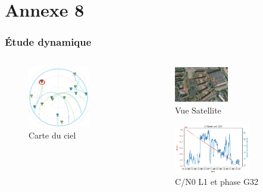\documentclass[xcolor=dvipsnames,envcountsect]{beamer}
\begin{document}
\section{Annexe 8}
\begin{frame}
	\frametitle{Étude dynamique}
	\begin{columns}
		\begin{column}{0.5\textwidth}
			\begin{figure}
				\centering
				\includegraphics[width=0.7\textwidth]{./Figures/skyplot_dyn.png}
				\caption {Carte du ciel}
			\end{figure}
		\end{column}
		\begin{column}{0.5\textwidth}
			\begin{figure}
				\centering
				\includegraphics[width=0.5\textwidth]{./Figures/global_view.jpg}
				\caption {Vue Satellite}
			\end{figure}
			\begin{figure}
				\centering
				\includegraphics[width=0.7\textwidth]{./Figures/L1-G32.png}
				\caption {C/N0 L1 et phase G32}
			\end{figure}
		\end{column}
	\end{columns}
\end{frame}
\end{document}
